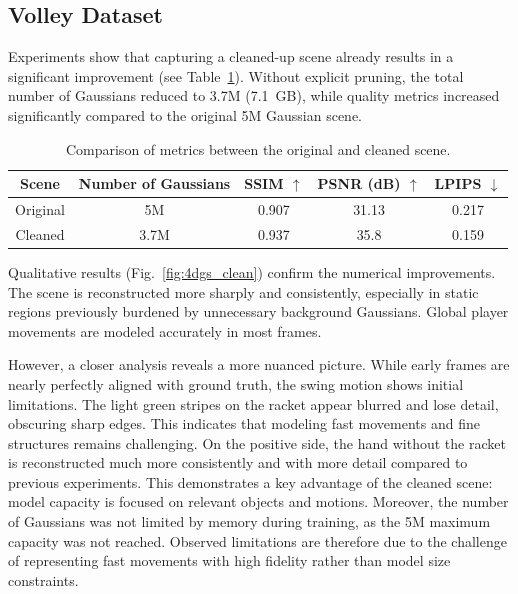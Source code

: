 \subsection{Volley Dataset}

Experiments show that capturing a cleaned-up scene already results in a significant improvement (see Table~\ref{tab:4dgs_clean_metrics}). 
Without explicit pruning, the total number of Gaussians reduced to 3.7M (7.1~GB), while quality metrics increased significantly compared to the original 5M Gaussian scene.

\begin{table}[h]
    \centering
    \caption{Comparison of metrics between the original and cleaned scene.}
    \label{tab:4dgs_clean_metrics}
    \begin{tabular}{ccccc}
        \toprule
        Scene & Number of Gaussians & SSIM $\uparrow$ & PSNR (dB) $\uparrow$ & LPIPS $\downarrow$ \\
        \midrule
        Original & 5M   & 0.907 & 31.13 & 0.217 \\
        Cleaned  & 3.7M & 0.937 & 35.8  & 0.159 \\
        \bottomrule
    \end{tabular}
\end{table}

Qualitative results (Fig.~\ref{fig:4dgs_clean}) confirm the numerical improvements. 
The scene is reconstructed more sharply and consistently, especially in static regions previously burdened by unnecessary background Gaussians. 
Global player movements are modeled accurately in most frames. 

However, a closer analysis reveals a more nuanced picture. 
While early frames are nearly perfectly aligned with ground truth, the swing motion shows initial limitations. 
The light green stripes on the racket appear blurred and lose detail, obscuring sharp edges. 
This indicates that modeling fast movements and fine structures remains challenging. 
On the positive side, the hand without the racket is reconstructed much more consistently and with more detail compared to previous experiments. 
This demonstrates a key advantage of the cleaned scene: model capacity is focused on relevant objects and motions. 
Moreover, the number of Gaussians was not limited by memory during training, as the 5M maximum capacity was not reached. 
Observed limitations are therefore due to the challenge of representing fast movements with high fidelity rather than model size constraints.

